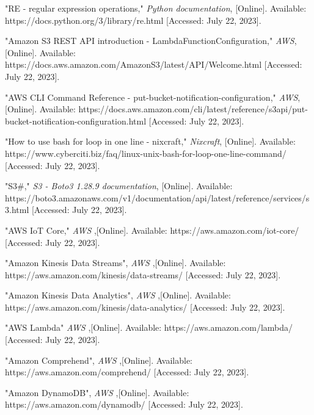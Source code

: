\begin{sloppypar}
\begin{enumerate}[label={[\arabic*]}]
    
    \item "RE - regular expression operations," \textit{Python documentation}, [Online]. Available: https://docs.python.org/3/library/re.html [Accessed: July 22, 2023].

    
    \item "Amazon S3 REST API introduction - LambdaFunctionConfiguration," \textit{AWS}, [Online]. Available: https://docs.aws.amazon.com/AmazonS3/latest/API/Welcome.html [Accessed: July 22, 2023].

    
    \item "AWS CLI Command Reference - put-bucket-notification-configuration," \textit{AWS}, [Online]. Available: https://docs.aws.amazon.com/cli/latest/reference/s3api/put-bucket-notification-configuration.html [Accessed: July 22, 2023].


    \item "How to use bash for loop in one line - nixcraft," \textit{Nixcraft}, [Online]. Available: https://www.cyberciti.biz/faq/linux-unix-bash-for-loop-one-line-command/ [Accessed: July 22, 2023].


    \item "S3\#," \textit{S3 - Boto3 1.28.9 documentation}, [Online]. Available: https://boto3.amazonaws.com/v1/documentation/api/latest/reference/services/s3.html [Accessed: July 22, 2023].


    \item "AWS IoT Core," \textit{AWS },[Online]. Available: https://aws.amazon.com/iot-core/ [Accessed: July 22, 2023].


    \item "Amazon Kinesis Data Streams", \textit{AWS} ,[Online]. Available: https://aws.amazon.com/kinesis/data-streams/ [Accessed: July 22, 2023].

    \item "Amazon Kinesis Data Analytics", \textit{AWS} ,[Online]. Available: https://aws.amazon.com/kinesis/data-analytics/ [Accessed: July 22, 2023].

    \item "AWS Lambda" \textit{AWS} ,[Online]. Available: https://aws.amazon.com/lambda/ [Accessed: July 22, 2023].

    \item "Amazon Comprehend", \textit{AWS} ,[Online]. Available: https://aws.amazon.com/comprehend/ [Accessed: July 22, 2023].

    \item "Amazon DynamoDB", \textit{AWS} ,[Online]. Available: https://aws.amazon.com/dynamodb/ [Accessed: July 22, 2023].


\end{enumerate}
\end{sloppypar}
